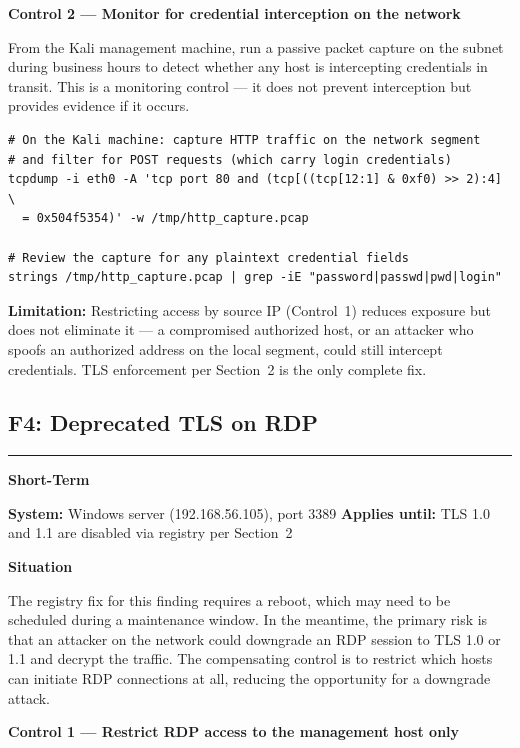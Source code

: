 \documentclass[12pt]{article}
\newcommand{\tfbadge}[2]{%
  \colorbox{#1}{\color{white}\textbf{\small #2}}%
}
\newcommand{\sectionrule}{%
  \vspace{4pt}\noindent\textcolor{headercol}{\rule{\linewidth}{0.8pt}}\vspace{4pt}%
}
\begin{document}
\bigskip
\noindent\textbf{Control 2 --- Monitor for credential interception on the network}
 
From the Kali management machine, run a passive packet capture on the subnet
during business hours to detect whether any host is intercepting credentials
in transit. This is a monitoring control --- it does not prevent interception
but provides evidence if it occurs.
 
\begin{lstlisting}[style=terminal]
# On the Kali machine: capture HTTP traffic on the network segment
# and filter for POST requests (which carry login credentials)
tcpdump -i eth0 -A 'tcp port 80 and (tcp[((tcp[12:1] & 0xf0) >> 2):4] \
  = 0x504f5354)' -w /tmp/http_capture.pcap
 
# Review the capture for any plaintext credential fields
strings /tmp/http_capture.pcap | grep -iE "password|passwd|pwd|login"
\end{lstlisting}
 
\begin{impactbox}
\textbf{Limitation:} Restricting access by source IP (Control~1) reduces
exposure but does not eliminate it --- a compromised authorized host, or an
attacker who spoofs an authorized address on the local segment, could still
intercept credentials. TLS enforcement per Section~2 is the only complete
fix.
\end{impactbox}
 
\subsection{F4: Deprecated TLS on RDP}
\sectionrule
 
\noindent\tfbadge{shortcol}{Short-Term}
\quad\textbf{System:} Windows server (192.168.56.105), port 3389
\quad\textbf{Applies until:} TLS 1.0 and 1.1 are disabled via registry per
Section~2
 
\bigskip
\noindent\textbf{Situation}
 
The registry fix for this finding requires a reboot, which may need to be
scheduled during a maintenance window. In the meantime, the primary risk is
that an attacker on the network could downgrade an RDP session to TLS 1.0 or
1.1 and decrypt the traffic. The compensating control is to restrict which
hosts can initiate RDP connections at all, reducing the opportunity for a
downgrade attack.
 
\bigskip
\noindent\textbf{Control 1 --- Restrict RDP access to the management host only}
 
\end{document}
